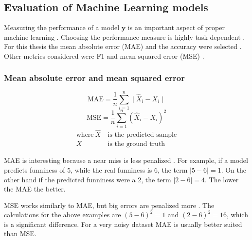 \documentclass[draft,final,oneside]{vutinfth} %
\begin{document}
\subsection{Evaluation of Machine Learning models}

Measuring the performance of a model $\boldsymbol{y}$ is an important aspect of proper machine learning \cite{performanceevaluation}. Choosing the performance measure is highly task dependent \cite{performanceevaluation}. For this thesis the mean absolute error (MAE) and the accuracy were selected \cite{accuracy}. Other metrics considered were F1 and mean squared error (MSE) \cite{accuracy} \cite{Powers2008EvaluationFP}.

\subsubsection{Mean absolute error and mean squared error}
\begin{equation}
\text{MAE} = \frac{1}{n}\textstyle \sum_{i=1}^n \displaystyle\mid \hat{X}_i - X_i \mid
\end{equation}
\begin{equation}
\text{MSE} = \frac{1}{n}\textstyle \sum_{i=1}^n \displaystyle\left( \hat{X}_i - X_i \right)^2
\end{equation}
\begin{align*}
\text{where}~\hat{X}&~\text{is the predicted sample} \\
X&~\text{is the ground truth}
\end{align*}

MAE is interesting because a near miss is less penalized \cite{accuracy}. For example, if a model predicts funniness of 5, while the real funniness is 6, the term $\mid 5 - 6 \mid = 1$. On the other hand if the predicted funniness were a 2, the term $\mid 2 - 6 \mid = 4$. The lower the MAE the better.

MSE works similarly to MAE, but big errors are penalized more \cite{accuracy}. The calculations for the above examples are $\left( 5 - 6 \right)^2 = 1$ and $\left( 2 - 6 \right)^2 = 16$, which is a significant difference. For a very noisy dataset MAE is usually better suited than MSE.
\end{document}
